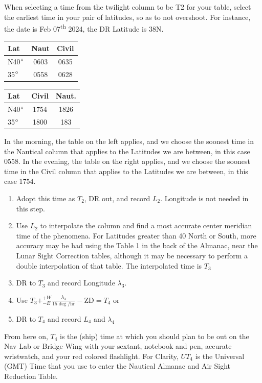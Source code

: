 \documentclass{article}
\newcommand{\ts}{\textsuperscript}
\begin{document}
When selecting a time from the twilight column to be T2 for your table, select the earliest time in your pair of latitudes, so as to not overshoot. For instance, the date is Feb 07\ts{th} 2024, the DR Latitude is 38N.
\begin{center}
    \begin{tabular}{|l|cc|}
\hline
Lat&Naut&Civil\\
\hline
N40$\degree$&0603&0635\\
35$\degree$&0558&0628\\
\hline
\end{tabular}
\quad
\begin{tabular}{|l|cc|}
\hline
Lat&Civil&Naut.\\
\hline
N40$\degree$&1754&1826\\
35$\degree$&1800&183\\
\hline
\end{tabular}
\end{center}
In the morning, the table on the left applies, and we choose the soonest time in the Nautical column that applies to the Latitudes we are between, in this case 0558. In the evening, the table on the right applies, and we choose the soonest time in the Civil column that applies to the Latitudes we are between, in this case 1754.
\begin{enumerate}
    \item Adopt this time as $T_2$, DR out, and record $L_2$. Longitude is not needed in this step.
    \item Use $L_2$ to interpolate the column and find a most accurate center meridian time of the phenomena. For Latitudes greater than 40 North or South, more accuracy may be had using the Table 1 in the back of the Almanac, near the Lunar Sight Correction tables, although it may be necessary to perform a double interpolation of that table. The interpolated time is $T_3$
    \item DR to $T_3$ and record Longitude $\lambda_3$.
    \item Use \(T_3+^{+W}_{-E}\frac{\lambda_3}{{15}\deg/\text{hr}}-\text{ZD}=T_4\) or 
    \item DR to $T_4$ and record $L_4$ and $\lambda_4$
\end{enumerate}
From here on, $T_4$ is the (ship) time at which you should plan to be out on the Nav Lab or Bridge Wing with your sextant, notebook and pen, accurate wristwatch, and your red colored flashlight. For Clarity, $UT_4$ is the Universal (GMT) Time that you use to enter the Nautical Almanac and Air Sight Reduction Table.
\end{document}
